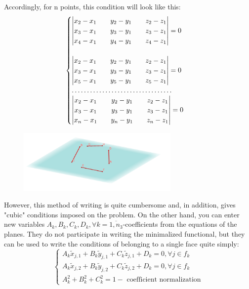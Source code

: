 \documentclass[11pt,fleqn,a4paper]{scrartcl}
\begin{document}
Accordingly, for n points, this condition will look like this:
$$
\begin{cases}
\begin{vmatrix}
x_2-x_1 && y_2-y_1&& z_2-z_1 \\
x_3-x_1 && y_3-y_1&& z_3-z_1 \\
x_4-x_1 && y_4-y_1&& z_4-z_1 \\
\end{vmatrix}=0 \\
\newline \\
\begin{vmatrix}
x_2-x_1 && y_2-y_1&& z_2-z_1 \\
x_3-x_1 && y_3-y_1&& z_3-z_1 \\
x_5-x_1 && y_5-y_1&& z_5-z_1 \\
\end{vmatrix}=0 \\
\hdots \hdots \hdots \hdots \hdots \hdots \hdots \hdots \hdots \hdots \hdots \\
\begin{vmatrix}
x_2-x_1 && y_2-y_1&& z_2-z_1 \\
x_3-x_1 && y_3-y_1&& z_3-z_1 \\
x_n-x_1 && y_n-y_1&& z_n-z_1 \\
\end{vmatrix}=0 \\
\end{cases}
$$
\begin{figure}
\centering
\includegraphics[width=0.7\textwidth]{inoneplane.png}
\end{figure}
However, this method of writing is quite cumbersome and, in addition, gives "cubic" conditions imposed on the problem. On the other hand, you can enter new variables $A_{k}, B_{k},C_{k},D_{k}, \forall k=\overline{1,n_{3}}$-coefficients from the equations of the planes. They do not participate in writing the minimalized functional, but they can be used to write the conditions of belonging to a single face quite simply:
$$
\begin{cases}
A_{k}\tilde{x}_{j,1}+B_{k}\tilde{y}_{j,1}+C_{k}\tilde{z}_{j,1}+D_{k}=0, \forall j \in f_{k}
\\
A_{k}\tilde{x}_{j, 2}+B_{k}\tilde{y}_{j, 2}+C_{k}\tilde{z}_{j, 2}+D_{k}=0, \forall j \in f_{k}
\\
A_{k}^{2}+B_{k}^{2}+C_{k}^{2}=1-\text{ coefficient normalization}
\end{cases}
$$
\end{document}
